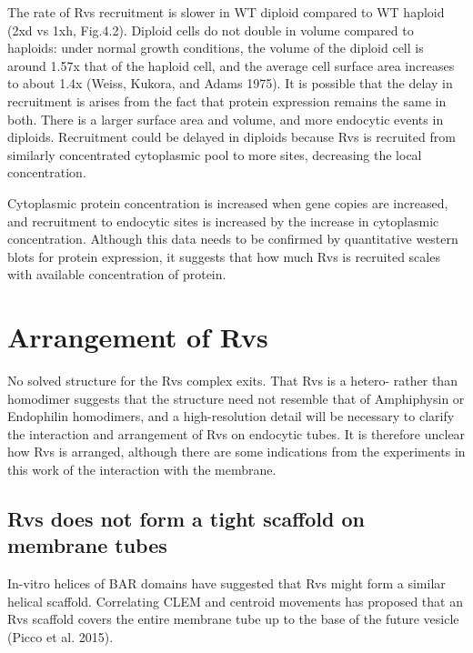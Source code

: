 {	\vspace{5mm}
The rate of Rvs recruitment is slower in WT diploid compared to WT haploid (2xd vs 1xh, Fig.4.2). Diploid cells do not double in volume compared to haploids: under normal growth conditions, the volume of the diploid cell is around 1.57x that of the haploid cell, and the average cell surface area increases to  about 1.4x (Weiss, Kukora, and Adams 1975). It is possible that the delay in recruitment is arises from the fact that protein expression remains the same in both. There is a larger surface area and volume, and more endocytic events in diploids. Recruitment could be delayed in diploids because Rvs is recruited from similarly concentrated cytoplasmic pool to more sites, decreasing the local concentration.

Cytoplasmic protein concentration is increased when gene copies are increased, and recruitment to endocytic sites is increased by the increase in cytoplasmic concentration. Although this data needs to be confirmed by quantitative western blots for protein expression, it suggests that how much Rvs is recruited scales with available concentration of protein. 



\section{Arrangement of Rvs}
No solved structure for the Rvs complex exits. That Rvs is a hetero- rather than homodimer suggests that the structure need not resemble that of Amphiphysin or Endophilin homodimers, and a high-resolution detail will be necessary to clarify the interaction and arrangement of Rvs on endocytic tubes. It is therefore unclear how Rvs is arranged, although there are some indications from the experiments in this work of the interaction with the membrane.


\subsection{Rvs does not form a tight scaffold on membrane tubes}
In-vitro helices of BAR domains have suggested that Rvs might form a similar helical scaffold. Correlating CLEM and centroid movements has proposed that an Rvs scaffold covers the entire membrane tube up to the base of the future vesicle (Picco et al. 2015). 

}
